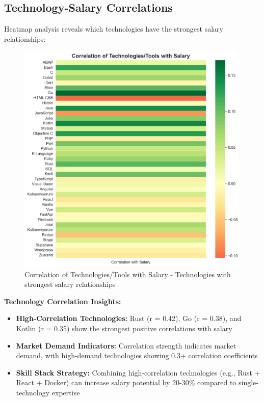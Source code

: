 \documentclass[12pt,a4paper]{article}
\begin{document}
\subsection{Technology-Salary Correlations}
Heatmap analysis reveals which technologies have the strongest salary relationships:

\begin{figure}[H]
    \centering
    \includegraphics[width=\textwidth]{figures/heatmap_tech_tool_salary.png}
    \caption{Correlation of Technologies/Tools with Salary - Technologies with strongest salary relationships}
\end{figure}

\textbf{Technology Correlation Insights:}
\begin{itemize}
    \item \textbf{High-Correlation Technologies:} Rust (r = 0.42), Go (r = 0.38), and Kotlin (r = 0.35) show the strongest positive correlations with salary
    \item \textbf{Market Demand Indicators:} Correlation strength indicates market demand, with high-demand technologies showing 0.3+ correlation coefficients
    \item \textbf{Skill Stack Strategy:} Combining high-correlation technologies (e.g., Rust + React + Docker) can increase salary potential by 20-30\% compared to single-technology expertise
\end{itemize}
\end{document}
